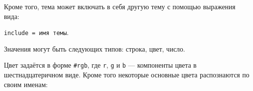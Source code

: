 \documentclass[a4paper,12pt]{article}
\begin{document}
Кроме того, тема может включать в себя другую тему с помощью выражения вида: 

\verb/include = имя темы/.

Значения могут быть следующих типов: строка, цвет, число.

Цвет задаётся в форме \verb/#rgb/, где \verb/r/, \verb/g/ и \verb/b/ --- компоненты цвета в шестнадцатеричном виде. Кроме того некоторые основные цвета распознаются по своим именам:

\newcommand{\tabColor}[2]{
\texttt{#1} & \colorbox[HTML]{#2}{T.} 
}

\newcommand{\tabColorq}[8]{
\tabColor{#1}{#2} & \tabColor{#3}{#4} & \tabColor{#5}{#6} & \tabColor{#7}{#8} \\
\hline
}

\newcommand{\tabColort}[6]{
\tabColor{#1}{#2} & \tabColor{#3}{#4} & \tabColor{#5}{#6} & & \\
\hline
}
\end{document}
